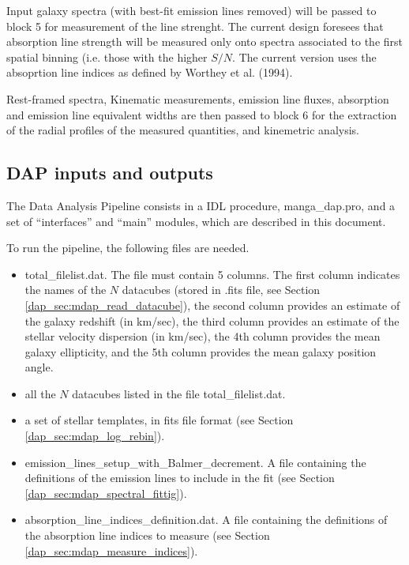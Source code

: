 \documentclass[11pt]{book}
\begin{document}
Input galaxy spectra (with best-fit emission lines removed) will be
passed to block 5 for measurement of the line strenght. The current
design foresees that absorption line strength will be measured only
onto spectra associated to the first spatial binning (i.e. those with
the higher $S/N$. The current version uses the absoprtion line indices
as defined by Worthey et al. (1994).

Rest-framed spectra, Kinematic measurements, emission line fluxes,
absorption and emission line equivalent widths are then passed to
block 6 for the extraction of the radial profiles of the measured
quantities, and kinemetric analysis.

\subsection{DAP inputs and outputs}
\label{dap_sec:dap_inputs_outputs}

The Data Analysis Pipeline consists in a IDL procedure,
manga\_dap.pro, and a set of ``interfaces'' and ``main'' modules,
which are described in this document.

To run the pipeline, the following files are needed.
\begin{itemize}

\item total\_filelist.dat. The file must contain 5 columns. The first
  column indicates the names of the $N$ datacubes (stored in .fits
  file, see Section \ref{dap_sec:mdap_read_datacube}), the second
  column provides an estimate of the galaxy redshift (in km/sec), the
  third column provides an estimate of the stellar velocity dispersion
  (in km/sec), the 4th column provides the mean galaxy ellipticity,
  and the 5th column provides the mean galaxy position angle.

\item all the $N$ datacubes listed in the file total\_filelist.dat.

\item a set of stellar templates, in fits file format (see Section \ref{dap_sec:mdap_log_rebin}).

\item emission\_lines\_setup\_with\_Balmer\_decrement. A file containing the definitions of the emission lines to include in the fit (see Section \ref{dap_sec:mdap_spectral_fittig}).

\item  absorption\_line\_indices\_definition.dat. A file containing the definitions of the absorption line indices to measure (see Section \ref{dap_sec:mdap_measure_indices}). 

\end{itemize}
\end{document}
